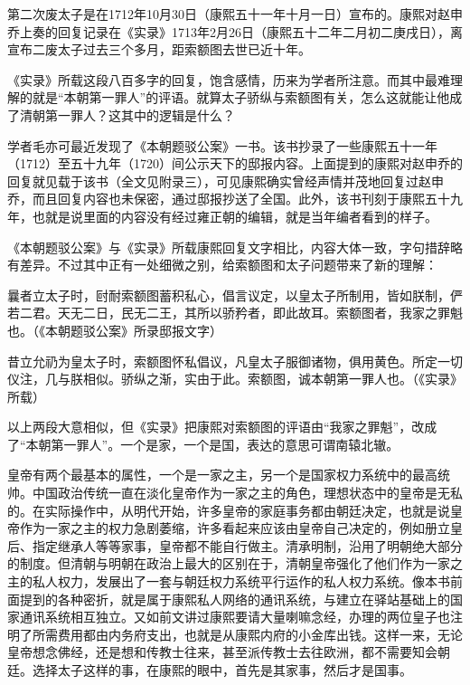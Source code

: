 
第二次废太子是在1712年10月30日（康熙五十一年十月一日）宣布的。康熙对赵申乔上奏的回复记录在《实录》1713年2月26日（康熙五十二年二月初二庚戌日），离宣布二废太子过去三个多月，距索额图去世已近十年。



《实录》所载这段八百多字的回复，饱含感情，历来为学者所注意。而其中最难理解的就是“本朝第一罪人”的评语。就算太子骄纵与索额图有关，怎么这就能让他成了清朝第一罪人？这其中的逻辑是什么？



学者毛亦可最近发现了《本朝题驳公案》一书。该书抄录了一些康熙五十一年（1712）至五十九年（1720）间公示天下的邸报内容。上面提到的康熙对赵申乔的回复就见载于该书（全文见附录三），可见康熙确实曾经声情并茂地回复过赵申乔，而且回复内容也未保密，通过邸报抄送了全国。此外，该书刊刻于康熙五十九年，也就是说里面的内容没有经过雍正朝的编辑，就是当年编者看到的样子。



《本朝题驳公案》与《实录》所载康熙回复文字相比，内容大体一致，字句措辞略有差异。不过其中正有一处细微之别，给索额图和太子问题带来了新的理解：



\begin{bookquote}曩者立太子时，尀耐索额图蓄积私心，倡言议定，以皇太子所制用，皆如朕制，俨若二君。天无二日，民无二王，其所以骄矜者，即此故耳。索额图者，我家之罪魁也。（《本朝题驳公案》所录邸报文字）\end{bookquote}


\begin{bookquote}昔立允礽为皇太子时，索额图怀私倡议，凡皇太子服御诸物，俱用黄色。所定一切仪注，几与朕相似。骄纵之渐，实由于此。索额图，诚本朝第一罪人也。（《实录》所载）\end{bookquote}


以上两段大意相似，但《实录》把康熙对索额图的评语由“我家之罪魁”，改成了“本朝第一罪人”。一个是家，一个是国，表达的意思可谓南辕北辙。



皇帝有两个最基本的属性，一个是一家之主，另一个是国家权力系统中的最高统帅。中国政治传统一直在淡化皇帝作为一家之主的角色，理想状态中的皇帝是无私的。在实际操作中，从明代开始，许多皇帝的家庭事务都由朝廷决定，也就是说皇帝作为一家之主的权力急剧萎缩，许多看起来应该由皇帝自己决定的，例如册立皇后、指定继承人等等家事，皇帝都不能自行做主。清承明制，沿用了明朝绝大部分的制度。但清朝与明朝在政治上最大的区别在于，清朝皇帝强化了他们作为一家之主的私人权力，发展出了一套与朝廷权力系统平行运作的私人权力系统。像本书前面提到的各种密折，就是属于康熙私人网络的通讯系统，与建立在驿站基础上的国家通讯系统相互独立。又如前文讲过康熙要请大量喇嘛念经，办理的两位皇子也注明了所需费用都由内务府支出，也就是从康熙内府的小金库出钱。这样一来，无论皇帝想念佛经，还是想和传教士往来，甚至派传教士去往欧洲，都不需要知会朝廷。选择太子这样的事，在康熙的眼中，首先是其家事，然后才是国事。


